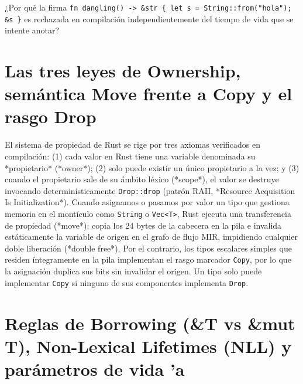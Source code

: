 \documentclass{book}
\begin{document}
\begin{tcolorbox}[title={Autoficha}, studiumcheck, breakable]

¿Por qué la firma \texttt{fn dangling() -> \&str \{ let s = String::from("hola"); \&s \}} es rechazada en compilación independientemente del tiempo de vida que se intente anotar?
\end{tcolorbox}

\section{Las tres leyes de Ownership, semántica Move frente a Copy y el rasgo Drop}

El sistema de propiedad de Rust se rige por tres axiomas verificados en compilación: (1) cada valor en Rust tiene una variable denominada su *propietario* (*owner*); (2) solo puede existir un único propietario a la vez; y (3) cuando el propietario sale de su ámbito léxico (*scope*), el valor se destruye invocando determinísticamente \texttt{Drop::drop} (patrón RAII, *Resource Acquisition Is Initialization*). Cuando asignamos o pasamos por valor un tipo que gestiona memoria en el montículo como \texttt{String} o \texttt{Vec<T>}, Rust ejecuta una transferencia de propiedad (*move*): copia los 24 bytes de la cabecera en la pila e invalida estáticamente la variable de origen en el grafo de flujo MIR, impidiendo cualquier doble liberación (*double free*). Por el contrario, los tipos escalares simples que residen íntegramente en la pila implementan el rasgo marcador \texttt{Copy}, por lo que la asignación duplica sus bits sin invalidar el origen. Un tipo solo puede implementar \texttt{Copy} si ninguno de sus componentes implementa \texttt{Drop}.

\section{Reglas de Borrowing (\&T vs \&mut T), Non-Lexical Lifetimes (NLL) y parámetros de vida 'a}
\end{document}
